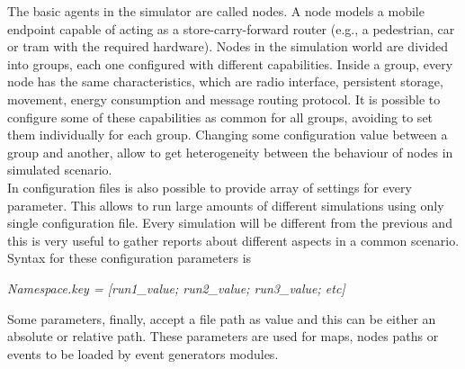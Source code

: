 The basic agents in the simulator are called nodes. A node models a mobile endpoint capable of acting as a store-carry-forward router (e.g., a pedestrian, car or tram with the required hardware). Nodes in the simulation world are divided into groups, each one configured with different capabilities. Inside a group, every node has the same characteristics, which are radio interface, persistent storage, movement, energy consumption and message routing protocol. It is possible to configure some of these capabilities as common for all groups, avoiding to set them individually for each group. Changing some configuration value between a group and another, allow to get heterogeneity between the behaviour of nodes in simulated scenario.
\\

In configuration files is also possible to provide array of settings for every parameter. This allows to run large amounts of different simulations using only single configuration file. Every simulation will be different from the previous and this is very useful to gather reports about different aspects in a common scenario.
\\ Syntax for these configuration parameters is

\begin{center}
\textit{Namespace.key = [run1_value; run2_value; run3_value; etc]}
\end{center}

Some parameters, finally, accept a file path as value and this can be either an absolute or relative path. These parameters are used for maps, nodes paths or events to be loaded by event generators modules.

